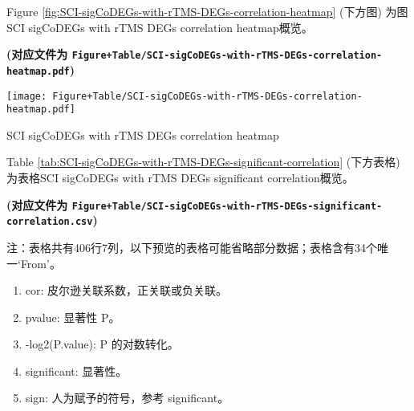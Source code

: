 \documentclass[
]{article}
\providecommand{\tightlist}{%
  \setlength{\itemsep}{0pt}\setlength{\parskip}{0pt}}
\begin{document}
Figure \ref{fig:SCI-sigCoDEGs-with-rTMS-DEGs-correlation-heatmap} (下方图) 为图SCI sigCoDEGs with rTMS DEGs correlation heatmap概览。

\textbf{(对应文件为 \texttt{Figure+Table/SCI-sigCoDEGs-with-rTMS-DEGs-correlation-heatmap.pdf})}

\def\@captype{figure}
\begin{center}
\texttt{[image: Figure+Table/SCI-sigCoDEGs-with-rTMS-DEGs-correlation-heatmap.pdf]}
\caption{SCI sigCoDEGs with rTMS DEGs correlation heatmap}\label{fig:SCI-sigCoDEGs-with-rTMS-DEGs-correlation-heatmap}
\end{center}

Table \ref{tab:SCI-sigCoDEGs-with-rTMS-DEGs-significant-correlation} (下方表格) 为表格SCI sigCoDEGs with rTMS DEGs significant correlation概览。

\textbf{(对应文件为 \texttt{Figure+Table/SCI-sigCoDEGs-with-rTMS-DEGs-significant-correlation.csv})}

\begin{center}\begin{tcolorbox}[colback=gray!10, colframe=gray!50, width=0.9\linewidth, arc=1mm, boxrule=0.5pt]注：表格共有406行7列，以下预览的表格可能省略部分数据；表格含有34个唯一`From'。
\end{tcolorbox}
\end{center}
\begin{center}\begin{tcolorbox}[colback=gray!10, colframe=gray!50, width=0.9\linewidth, arc=1mm, boxrule=0.5pt]\begin{enumerate}\tightlist
\item cor: 皮尔逊关联系数，正关联或负关联。
\item pvalue: 显著性 P。
\item -log2(P.value): P 的对数转化。
\item significant: 显著性。
\item sign: 人为赋予的符号，参考 significant。
\end{enumerate}\end{tcolorbox}
\end{center}
\end{document}
